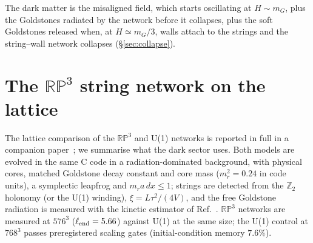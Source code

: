 \documentclass[11pt,a4paper]{article}
\newcommand{\RP}{\mathbb{RP}^3}
\newcommand{\Ztwo}{\mathbb{Z}_2}
\begin{document}
The dark matter is the misaligned field, which starts oscillating at $H\sim m_G$, plus the Goldstones radiated by the network before it collapses, plus the soft Goldstones released when, at $H\simeq m_G/3$, walls attach to the strings and the string--wall network collapses (\S\ref{sec:collapse}).

\section{The \texorpdfstring{$\RP$}{RP3} string network on the lattice}
\label{sec:network}

The lattice comparison of the $\RP$ and U(1) networks is reported in full in a companion paper~\cite{rp3_paper}; we summarise what the dark sector uses.
Both models are evolved in the same C code in a radiation-dominated background, with physical cores, matched Goldstone decay constant and core mass ($m_r^2=0.24$ in code units), a symplectic leapfrog and $m_r a\,dx\le1$; strings are detected from the $\Ztwo$ holonomy (or the U(1) winding), $\xi=L\tau^2/(4V)$, and the free Goldstone radiation is measured with the kinetic estimator of Ref.~\cite{GHV2018}.
$\RP$ networks are measured at $576^3$ ($\ell_{\rm end}=5.66$) against U(1) at the same size; the U(1) control at $768^3$ passes preregistered scaling gates (initial-condition memory $7.6\%$).
\end{document}
